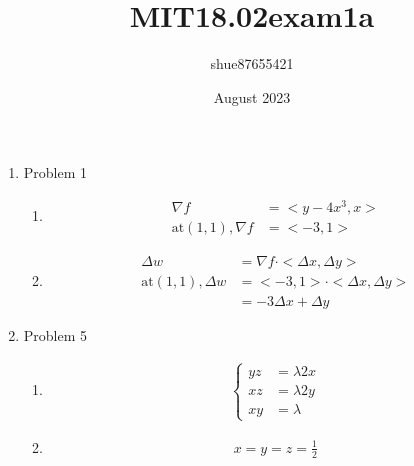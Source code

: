 \documentclass{article}
\title{MIT18.02exam1a}
\author{shue87655421 }
\date{August 2023}
\begin{document}
\maketitle

\begin{enumerate}
\item Problem 1

\begin{enumerate}
    \item 
    \begin{align}
        \nabla f &= <y-4x^3, x>\\
        \text{at} (1, 1), \nabla f &= <-3, 1>
    \end{align}
    
    \item
    \begin{align*}
        \Delta w &= \nabla f \cdot <\Delta x, \Delta y>\\
        \text{at} (1, 1), \Delta w &= <-3, 1> \cdot <\Delta x, \Delta y>\\
        &= -3\Delta x + \Delta y
    \end{align*}
\end{enumerate}

\item Problem 5
    \begin{enumerate}
    \item 
    \begin{align*}
        \begin{cases}
        yz &= \lambda 2x\\
        xz &= \lambda 2y\\
        xy &= \lambda 
        \end{cases}
    \end{align*}
    \item 
    \begin{align*}
        x = y = z = \frac{1}{2}
    \end{align*}
    \end{enumerate}


\end{enumerate}
\end{document}
